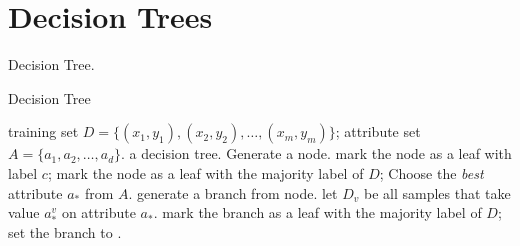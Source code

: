\section{Decision Trees}
Decision Tree.

\begin{algorithm}
    \caption{Decision Tree}\label{decision_tree}
    \begin{algorithmic}[1]
        \Require training set $D = \{(x_1, y_1), (x_2, y_2), \ldots, (x_m, y_m)
        \}$; attribute set $A = \{a_1, a_2, \ldots, a_d\}$.
        \Ensure a decision tree.
            \State Generate a node.
             
                \State mark the node as a leaf with label $c$; \Return
            \EndIf
                \State mark the node as a leaf with the majority label of $D$; 
                \Return
            \EndIf
            \State Choose the \textit{best} attribute $a_*$ from $A$.\label{measurement}
                \State generate a branch from node.
                \State let $D_v$ be all samples that take value $a_*^v$ on attribute
                $a_*$.
                 
                    \State mark the branch as a leaf with the majority label of 
                    $D$; \Return
                \Else
                    \State set the branch to .
                \EndIf
            \EndFor
        \EndProcedure
    \end{algorithmic}
\end{algorithm}

